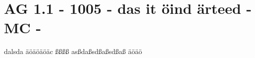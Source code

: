 \section{AG 1.1 - 1005 - das it öind ärteed - MC - }

\begin{beispiel}[AG 1.1]{1}
dalsda äöäöäöäc ßßßß asßdaßsdßaßsdßaß äöäö
\end{beispiel}